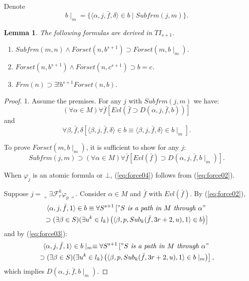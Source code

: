 \documentclass{asl}
\newtheorem{lemma}{Lemma}[section]
\theoremstyle{definition}
\begin{document}
Denote
\[b\mid_m=\lbrace\langle\alpha,j,\bar{f},\delta\rangle\in b\mid Subfrm(j,m)\rbrace.\]
\begin{lemma}
The following formulas are derived in $TI_{s+1}$.
\begin{enumerate}
\item $Subfrm(m,n)\wedge Forset(n, b^{s+1})\supset Forset(m, b\mid_m)$.
\medskip
\item $Forset(n, b^{s+1})\wedge Forset(n, c^{s+1})\supset b=c$.
\medskip
\item $Frm(n)\supset\exists !b^{s+1} Forset(n,b)$.
\end{enumerate}
\label{lemma:force5}
\end{lemma}
\begin{proof}
1. Assume the premises. For any $j$ with $Subfrm(j,m)$ we have:
\begin{equation}
(\forall\alpha\in M)\forall\bar{f}\left[Evl(\bar{f}\supset D(\alpha,j,\bar{f},b)) \right] 
\label{eq:force02}
\end{equation}
and 
\begin{equation}
\forall\beta,\bar{f},\delta\left[\langle\beta,j,\bar{f},\delta\rangle\in b\equiv\langle\beta,j,\bar{f},\delta\rangle\in b\mid_m \right]. 
\label{eq:force03}
\end{equation}

To prove $Forset(m,b\mid_m )$, it is sufficient to show for any $j$:
\begin{equation}
Subfrm(j,m)\supset(\forall\alpha\in M)\forall\bar{f}\left[Evl(\bar{f})\supset D(\alpha,j,\bar{f},b\mid_m)\right]. 
\label{eq:force04}
\end{equation}

When $\varphi_j$ is an atomic formula or $\bot$, (\ref{eq:force04}) follows from (\ref{eq:force02}). 

Suppose $j=\llcorner\exists\mathcal{F}_r^k  \varphi_p\lrcorner$. Consider $\alpha\in M$ and $\bar{f}$ with $Evl(\bar{f})$. By (\ref{eq:force02}),
\begin{multline*}
\langle \alpha,j,\bar{f},1\rangle \in b\equiv
\forall S^{s+1}\left["S\textit{ is a path in }M\textit{ through }\alpha" 
\right.
\\
\left.
\supset(\exists\beta\in S)(\exists u^k\in l_k)\left(\langle \beta,p,Sub_k(\bar{f},3r+2,u),1\rangle \in b\right) \right]
\end{multline*}
and by (\ref{eq:force03}):
\begin{multline*}
\langle \alpha,j,\bar{f},1\rangle \in b\mid_m\equiv
\forall S^{s+1}\left["S\textit{ is a path in }M\textit{ through }\alpha" 
\right.
\\
\left.
\supset(\exists\beta\in S)(\exists u^k\in l_k)\left(\langle \beta,p,Sub_k(\bar{f},3r+2,u),1\rangle \in b\mid_m\right)\right],
\end{multline*}
which implies $D(\alpha,j,\bar{f},b\mid_m)$. 


\end{proof}
\end{document}
